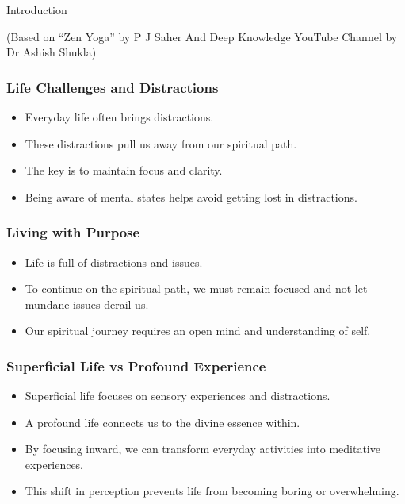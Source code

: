 \begin{frame}[fragile]\frametitle{}
\begin{center}
{\Large Introduction}


{\tiny (Based on ``Zen Yoga'' by P J Saher And Deep Knowledge YouTube Channel by Dr Ashish Shukla)}
\end{center}
\end{frame}


\begin{frame}[fragile]\frametitle{Life Challenges and Distractions}
\begin{itemize}
    \item Everyday life often brings distractions.
    \item These distractions pull us away from our spiritual path.
    \item The key is to maintain focus and clarity.
    \item Being aware of mental states helps avoid getting lost in distractions.
\end{itemize}
\end{frame}

\begin{frame}[fragile]\frametitle{Living with Purpose}
\begin{itemize}
    \item Life is full of distractions and issues.
    \item To continue on the spiritual path, we must remain focused and not let mundane issues derail us.
    \item Our spiritual journey requires an open mind and understanding of self.
\end{itemize}
\end{frame}

\begin{frame}[fragile]\frametitle{Superficial Life vs Profound Experience}
\begin{itemize}
    \item Superficial life focuses on sensory experiences and distractions.
    \item A profound life connects us to the divine essence within.
    \item By focusing inward, we can transform everyday activities into meditative experiences.
    \item This shift in perception prevents life from becoming boring or overwhelming.
\end{itemize}
\end{frame}

